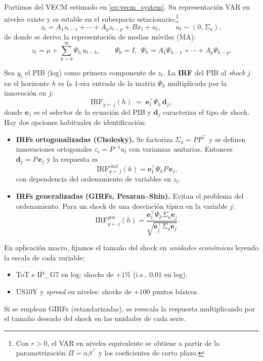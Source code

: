 \documentclass[11pt,a4paper]{article}
\newcommand{\1}{\mathbf{1}}
\begin{document}
Partimos del VECM estimado en \eqref{eq:vecm_system}. Su representación VAR en niveles existe y es estable en el subespacio estacionario:\footnote{Con $r>0$, el VAR en niveles equivalente se obtiene a partir de la parametrización $\Pi=\alpha\beta^\top$ y los coeficientes de corto plazo.}
\begin{equation}
z_t
=
A_1 z_{t-1} + \cdots + A_p z_{t-p} + B x_t + u_t,
\qquad
u_t \sim (0,\Sigma_u),
\label{eq:var_levels}
\end{equation}
de donde se deriva la representación de medias móviles (MA):
\begin{equation}
z_t
=
\mu + \sum_{h=0}^{\infty} \Psi_h\, u_{t-h},
\qquad
\Psi_0 = I,\ \ \Psi_h = A_1 \Psi_{h-1} + \cdots + A_p \Psi_{h-p}.
\label{eq:ma_representation}
\end{equation}

Sea $y_t$ el PIB (log) como primera componente de $z_t$. La \textbf{IRF} del PIB al \emph{shock} $j$ en el horizonte $h$ es la $1$-era entrada de la matriz $\Psi_h$ multiplicada por la innovación en $j$:
\[
\text{IRF}_{y \leftarrow j}(h)
\;=\;
\mathbf{e}_1^\top \Psi_h\, \mathbf{d}_j,
\]
donde $\mathbf{e}_1$ es el selector de la ecuación del PIB y $\mathbf{d}_j$ caracteriza el tipo de shock. Hay dos opciones habituales de identificación:

\begin{itemize}
  \item \textbf{IRFs ortogonalizadas (Cholesky).} Se factoriza $\Sigma_u = P P^\top$ y se definen innovaciones ortogonales $\varepsilon_t = P^{-1} u_t$ con varianzas unitarias. Entonces $\mathbf{d}_j = P\, \mathbf{e}_j$ y la respuesta es
  \[
  \text{IRF}^{\text{chol}}_{y \leftarrow j}(h) = \mathbf{e}_1^\top \Psi_h P\, \mathbf{e}_j,
  \]
  con dependencia del ordenamiento de variables en $z_t$.

  \item \textbf{IRFs generalizadas (GIRFs, Pesaran--Shin).} Evitan el problema del ordenamiento. Para un shock de una desviación típica en la variable $j$:
  \[
  \text{IRF}^{\text{gen}}_{y \leftarrow j}(h)
  =
  \frac{ \mathbf{e}_1^\top \Psi_h \Sigma_u \mathbf{e}_j }{ \sqrt{ \mathbf{e}_j^\top \Sigma_u \mathbf{e}_j } }.
  \]
\end{itemize}

En aplicación macro, fijamos el tamaño del shock en \emph{unidades económicas} leyendo la escala de cada variable:
\begin{itemize}
  \item ToT e IP\_G7 en log: shocks de \(+1\%\) (i.e., \(0.01\) en log).
  \item US10Y y \emph{spread} en niveles: shocks de \(+100\) puntos básicos.
\end{itemize}
Si se emplean GIRFs (estandarizadas), se reescala la respuesta multiplicando por el tamaño deseado del shock en las unidades de cada serie.
\end{document}
